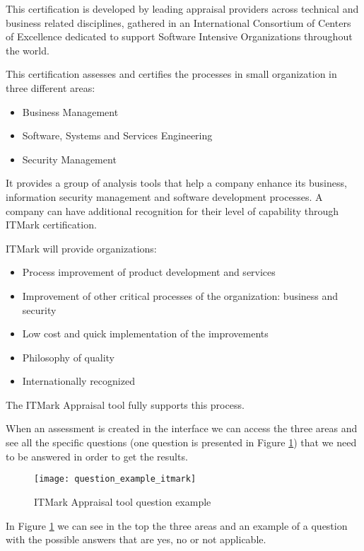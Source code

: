 This certification is developed by leading appraisal providers across technical and business related disciplines, gathered in an International Consortium of Centers of Excellence dedicated to support Software Intensive Organizations throughout the world.

This certification assesses and certifies the processes in small organization in three different areas:
\begin{itemize}
	\item Business Management
	\item Software, Systems and Services Engineering
	\item Security Management
\end{itemize}

It provides a group of analysis tools that help a company enhance its business, information security management and software development processes. A company can have additional recognition for their level of capability through ITMark certification.

ITMark will provide organizations:
\begin{itemize}
	\item Process improvement of product development and services
	\item Improvement of other critical processes of the organization: business and security
	\item Low cost and quick implementation of the improvements
	\item Philosophy of quality
	\item Internationally recognized
\end{itemize}

The ITMark Appraisal \citep{ITMARKASSESSMENT} tool fully supports this process.


When an assessment is created in the interface we can access the three areas and see all the specific questions (one question is presented in Figure \ref{fig:itmark_question}) that we need to be answered in order to get the results.

\begin{figure}[h]
	\begin{center}
		\leavevmode
		\texttt{[image: question\_example\_itmark]}
		\caption{ITMark Appraisal tool question example}
		\label{fig:itmark_question}
	\end{center}
\end{figure}

In Figure \ref{fig:itmark_question} we can see in the top the three areas and an example of a question with the possible answers that are yes, no or not applicable.

